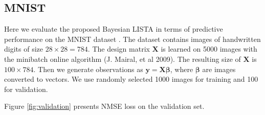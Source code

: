\documentclass[letterpaper]{article}
\begin{document}

\subsection{MNIST}
Here we evaluate the proposed Bayesian LISTA in terms of predictive performance on the MNIST dataset \cite{lecun2010mnist}. The dataset contains images of handwritten digits of size $28 \times 28 = 784$. The design matrix $\mathbf{X}$ is learned on 5000 images with the minibatch online algorithm (J. Mairal, et al 2009). The resulting size of $\mathbf{X}$ is $100 \times 784$. Then we generate observations as $\mathbf{y} = \mathbf{X}\boldsymbol\beta$, where $\boldsymbol\beta$ are images converted to vectors. We use randomly selected 1000 images for training and 100 for validation. 

Figure \ref{fig:validation} presents NMSE loss on the validation set. 
\end{document}

